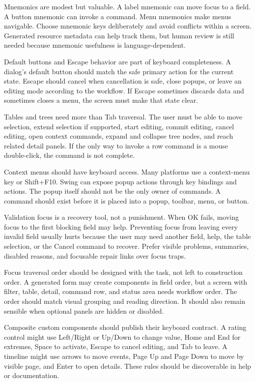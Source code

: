 Mnemonics are modest but valuable. A label mnemonic can move focus to a field. A button mnemonic can invoke a command. Menu mnemonics make menus navigable. Choose mnemonic keys deliberately and avoid conflicts within a screen. Generated resource metadata can help track them, but human review is still needed because mnemonic usefulness is language-dependent.

Default buttons and Escape behavior are part of keyboard completeness. A dialog's default button should match the safe primary action for the current state. Escape should cancel when cancellation is safe, close popups, or leave an editing mode according to the workflow. If Escape sometimes discards data and sometimes closes a menu, the screen must make that state clear.

Tables and trees need more than Tab traversal. The user must be able to move selection, extend selection if supported, start editing, commit editing, cancel editing, open context commands, expand and collapse tree nodes, and reach related detail panels. If the only way to invoke a row command is a mouse double-click, the command is not complete.

Context menus should have keyboard access. Many platforms use a context-menu key or Shift+F10. Swing can expose popup actions through key bindings and actions. The popup itself should not be the only owner of commands. A command should exist before it is placed into a popup, toolbar, menu, or button.

Validation focus is a recovery tool, not a punishment. When OK fails, moving focus to the first blocking field may help. Preventing focus from leaving every invalid field usually hurts because the user may need another field, help, the table selection, or the Cancel command to recover. Prefer visible problems, summaries, disabled reasons, and focusable repair links over focus traps.

Focus traversal order should be designed with the task, not left to construction order. A generated form may create components in field order, but a screen with filter, table, detail, command row, and status area needs workflow order. The order should match visual grouping and reading direction. It should also remain sensible when optional panels are hidden or disabled.

Composite custom components should publish their keyboard contract. A rating control might use Left/Right or Up/Down to change value, Home and End for extremes, Space to activate, Escape to cancel editing, and Tab to leave. A timeline might use arrows to move events, Page Up and Page Down to move by visible page, and Enter to open details. These rules should be discoverable in help or documentation.

